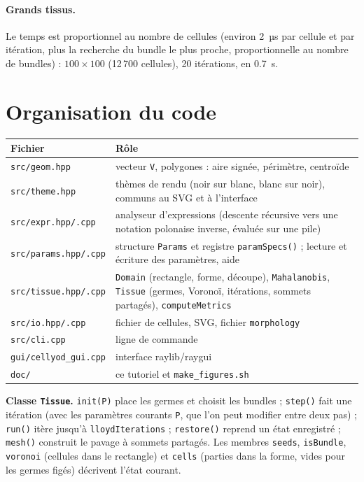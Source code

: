 \documentclass[10pt,a4paper]{article}
\newcommand{\code}[1]{\texttt{#1}}
\begin{document}
\paragraph{Grands tissus.} Le temps est proportionnel au nombre de cellules (environ 2~µs par cellule et par
itération, plus la recherche du bundle le plus proche, proportionnelle au nombre de bundles) : $100\times100$
(12\,700 cellules), 20 itérations, en 0.7~s.

\section{Organisation du code}\label{sec:code}

\begin{center}
\begin{tabularx}{\linewidth}{@{}lX@{}}
  \toprule
  Fichier & Rôle \\
  \midrule
  \code{src/geom.hpp} & vecteur \code{V}, polygones : aire signée, périmètre, centroïde \\
  \code{src/theme.hpp} & thèmes de rendu (noir sur blanc, blanc sur noir), communs au SVG et à l'interface \\
  \code{src/expr.hpp/.cpp} & analyseur d'expressions (descente récursive vers une notation polonaise inverse,
    évaluée sur une pile) \\
  \code{src/params.hpp/.cpp} & structure \code{Params} et registre \code{paramSpecs()} ; lecture et écriture des
    paramètres, aide \\
  \code{src/tissue.hpp/.cpp} & \code{Domain} (rectangle, forme, découpe), \code{Mahalanobis}, \code{Tissue}
    (germes, Voronoï, itérations, sommets partagés), \code{computeMetrics} \\
  \code{src/io.hpp/.cpp} & fichier de cellules, SVG, fichier \code{morphology} \\
  \code{src/cli.cpp} & ligne de commande \\
  \code{gui/cellyod\_gui.cpp} & interface raylib/raygui \\
  \code{doc/} & ce tutoriel et \code{make\_figures.sh} \\
  \bottomrule
\end{tabularx}
\end{center}

\textbf{Classe \code{Tissue}.} \code{init(P)} place les germes et choisit les bundles ; \code{step()} fait une
itération (avec les paramètres courants \code{P}, que l'on peut modifier entre deux pas) ; \code{run()} itère jusqu'à
\code{lloydIterations} ; \code{restore()} reprend un état enregistré ; \code{mesh()} construit le pavage à sommets
partagés. Les membres \code{seeds}, \code{isBundle}, \code{voronoi} (cellules dans le rectangle) et \code{cells}
(parties dans la forme, vides pour les germes figés) décrivent l'état courant.
\end{document}
